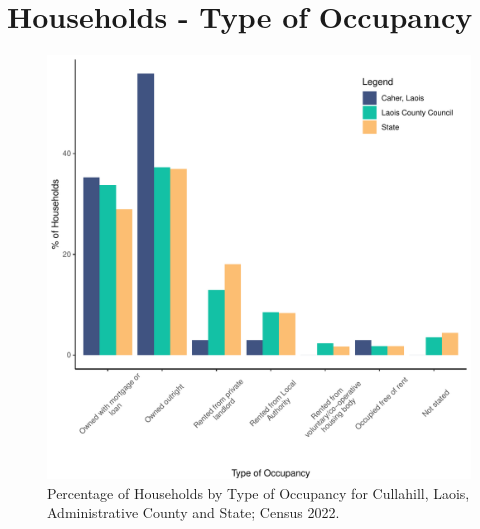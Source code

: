 \documentclass{article}
\begin{document}
\section{Households - Type of Occupancy}\label{sect:Households}
\begin{figure}[H]
	\centering
	\includegraphics[width = 140mm]{../figures/HouseholdsED.pdf}
	\caption{Percentage of Households by Type of Occupancy for Cullahill, Laois, Administrative County and State; Census 2022.}
	\label{fig:vbnv}
	\end{figure}
\end{document}
